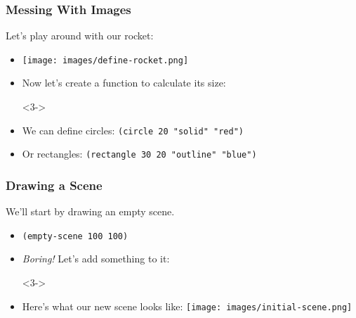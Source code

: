 \documentclass{beamer}
\begin{document}



\begin{frame}
  \frametitle{Messing With Images}
  Let's play around with our rocket:
  \begin{itemize}
  \item \texttt{[image: images/define-rocket.png]}
  \item<2-> Now let's create a function to calculate its size:
  \item[]<3-> \rocketSize
  \item<4-> We can define circles: \texttt{(circle 20 "solid" "red")}
  \item<4-> Or rectangles: \texttt{(rectangle 30  20 "outline" "blue")}
  \end{itemize}
\end{frame}



\begin{frame}
  \frametitle{Drawing a Scene}
  We'll start by drawing an empty scene.
  \begin{itemize}
  \item \texttt{(empty-scene 100 100)}
  \item<2-> \emph{Boring!} Let's add something to it:
  \item[]<3-> \initialScene
  \item<4->Here's what our new scene looks like: \texttt{[image: images/initial-scene.png]}
  \end{itemize}
\end{frame}
\end{document}
